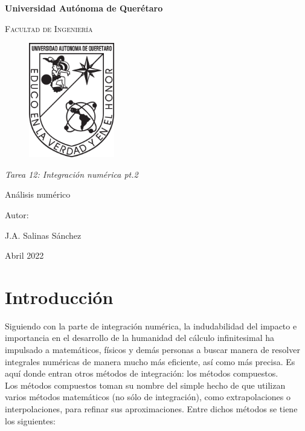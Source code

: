 \documentclass[12pt,oneside,FLEQN]{report}
\begin{document}
{
\selectfont
	\BgThispage
\begin{titlepage}
        \topmargin=1cm
        \centering

        {\bfseries\LARGE Universidad Autónoma de Querétaro \par}
        \vspace{1cm}
        {\scshape\Large  Facultad de Ingenier\'ia  \par}
        \vspace{3cm}
        \begin{figure}[!h]
        	\centering
                \includegraphics[height=5cm]{Logouaq.png}
        \end{figure}
        \vspace{2cm}
        {\itshape\large Tarea 12: Integración numérica pt.2\par}
        \vspace{3cm}
        {\Huge Análisis numérico\par}
        \vspace{2cm}
        {\Large Autor: \par}
        {\large J.A. Salinas Sánchez \par}
        {\large Abril 2022 \par}
\end{titlepage}
	\clearpage
	\newpage
\tableofcontents
\chapter{Introducción}
Siguiendo con la parte de integración numérica, la indudabilidad del impacto e importancia en el desarrollo de la humanidad del cálculo infinitesimal ha impulsado a matemáticos, físicos y demás personas a buscar manera de resolver integrales numéricas de manera mucho más eficiente, así como más precisa. Es aquí donde entran otros métodos de integración: los métodos compuestos.\\

Los métodos compuestos toman su nombre del simple hecho de que utilizan varios métodos matemáticos (no sólo de integración), como extrapolaciones o interpolaciones, para refinar sus aproximaciones. Entre dichos métodos se tiene los siguientes:
}
\end{document}
